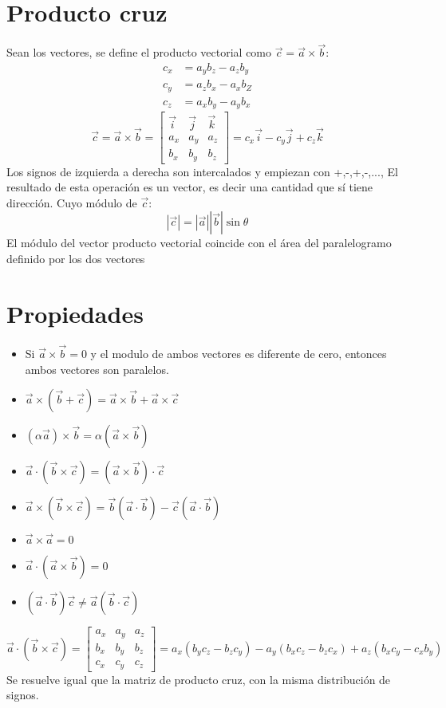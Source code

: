 \documentclass[
	12pt, %
	fleqn, %
	a4paper, %
]{LegrandOrangeBook}
\begin{document}
\section{Producto cruz}
Sean los vectores, se define el producto vectorial como $\vec{c}=\vec{a}\times\vec{b}$:
\begin{align*}
c_x&=a_yb_z - a_zb_y\\
c_y&=a_zb_x - a_xb_Z\\
c_z&=a_xb_y - a_yb_x
\end{align*}
\begin{equation}
\vec{c}=\vec{a}\times\vec{b}=
\begin{bmatrix}
     \vec{i} & \vec{j} & \vec{k}\\
     a_x & a_y & a_z\\
     b_x & b_y & b_z
   \end{bmatrix}
=c_x\vec{i}-c_y\vec{j}+c_z\vec{k}
\end{equation}
Los signos de izquierda a derecha son intercalados y empiezan con +,-,+,-,...,
El resultado de esta operación es un vector, es decir una cantidad que sí tiene dirección. 
Cuyo módulo de $\vec{c}$:
\begin{equation}
|\vec{c}|=|\vec{a}||\vec{b}|\sin\theta
\end{equation}
El módulo del vector producto vectorial coincide con el área del paralelogramo definido por los dos vectores
\section{Propiedades}
\begin{itemize}
\item Si $\vec{a}\times\vec{b}=0$ y el modulo de ambos vectores es diferente de cero, entonces ambos vectores son paralelos.
\item $\vec{a}\times(\vec{b}+\vec{c})=\vec{a}\times\vec{b}+\vec{a}\times\vec{c}$
\item $(\alpha\vec{a})\times\vec{b}=\alpha(\vec{a}\times\vec{b})$
\item $\vec{a}\cdot(\vec{b}\times\vec{c})=(\vec{a}\times\vec{b})\cdot\vec{c}$
\item $\vec{a}\times(\vec{b}\times\vec{c})=\vec{b}(\vec{a}\cdot\vec{b}) - \vec{c}(\vec{a}\cdot\vec{b})$
\item $\vec{a}\times\vec{a}=0$
\item $\vec{a}\cdot(\vec{a}\times\vec{b})=0	$
\item $(\vec{a}\cdot\vec{b})\vec{c}\neq\vec{a}(\vec{b}\cdot\vec{c})$
\end{itemize}
\begin{equation}
\vec{a}\cdot(\vec{b}\times\vec{c})=
\begin{bmatrix}
     a_x & a_y & a_z\\
     b_x & b_y & b_z\\
     c_x & c_y & c_z
   \end{bmatrix}
=a_x(b_yc_z-b_zc_y)-a_y(b_xc_z-b_zc_x)+a_z(b_xc_y-c_xb_y)
\end{equation}
Se resuelve igual que la matriz de producto cruz, con la misma distribución de signos.
\end{document}
